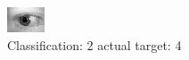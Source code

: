 \begin{figure}[h!]
\begin{center}
\includegraphics[width=0.60\columnwidth]{figures/ID814_class_2_target_4.png}
\end{center}
\caption{ Classification: 2 actual target: 4}
\label{fig:ID814_class_2_target_4}
\end{figure}
